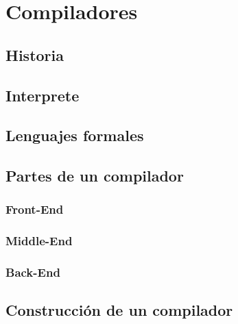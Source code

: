 
\chapter{Compiladores}

\section{Historia}

\section{Interprete}

\section{Lenguajes formales}

\section{Partes de un compilador}

\subsection{Front-End}
\subsection{Middle-End}
\subsection{Back-End}

\section{Construcción de un compilador}



